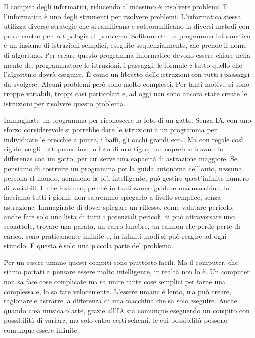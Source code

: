 \documentclass[12pt]{book} %
\begin{document}
Il compito degli informatici, riducendo al massimo è: risolvere problemi. E l'informatica è uno
degli strumenti per risolvere problemi. L'informatica stessa utilizza diverse strategie che si
ramificano e sottoramificano in diversi metodi con pro e contro per la tipologia di problema. Solitamente un programma
informatico è un insieme di istruzioni semplici, eseguite sequenzialmente, che prende il nome di algoritmo. Per creare
questo programma informatico devono essere chiare nella mente del programmatore le istruzioni, i passaggi, le formule e
tutto quello che l'algoritmo dovrà eseguire. È come un libretto delle istruzioni con tutti i
passaggi da svolgere. Alcuni problemi però sono molto complessi. Per tanti motivi, ci sono troppe variabili, troppi
casi particolari e, ad oggi non sono ancora state create le istruzioni per risolvere questo problema. 

Immaginate un programma per riconoscere la foto di un gatto. Senza IA, con uno sforzo considerevole si potrebbe dare le
istruzioni a un programma per individuare le orecchie a punta, i baffi, gli occhi grandi ecc… Ma con regole così
rigide, se gli sottoponessimo la foto di una tigre, non saprebbe trovare le differenze con un gatto, per cui serve una
capacità di astrazione maggiore. Se pensiamo di costruire un programma per la guida autonoma
dell'auto, nessuna persona al mondo, nemmeno la più intelligente, può gestire
quest'infinito numero di variabili. Il che è strano, perché in tanti sanno guidare una macchina,
lo facciamo tutti i giorni, non sapremmo spiegarlo a livello semplice, senza astrazione. Immaginate di dover spiegare
un riflesso, come valutare pericolo, anche fare solo una lista di tutti i potenziali pericoli, ti può attraversare uno
scoiattolo, trovare una parata, un carro funebre, un camion che perde parte di carico, sono praticamente infinite e, in
infiniti modi si può reagire ad ogni stimolo. E questa è solo una piccola parte del problema. 

Per un essere umano questi compiti sono piuttosto facili. Ma il computer, che siamo portati a pensare essere molto
intelligente, in realtà non lo è. Un computer non sa fare cose complicate ma sa unire tante cose semplici per farne una
complessa e, lo sa fare velocemente. L'essere umano è lento, ma può creare, ragionare e astrarre,
a differenza di una macchina che sa solo eseguire. Anche quando crea musica o arte, grazie all'IA
sta comunque eseguendo un compito con possibilità di variare, ma solo entro certi schemi, le cui possibilità possono
comunque essere infinite.
\end{document}
